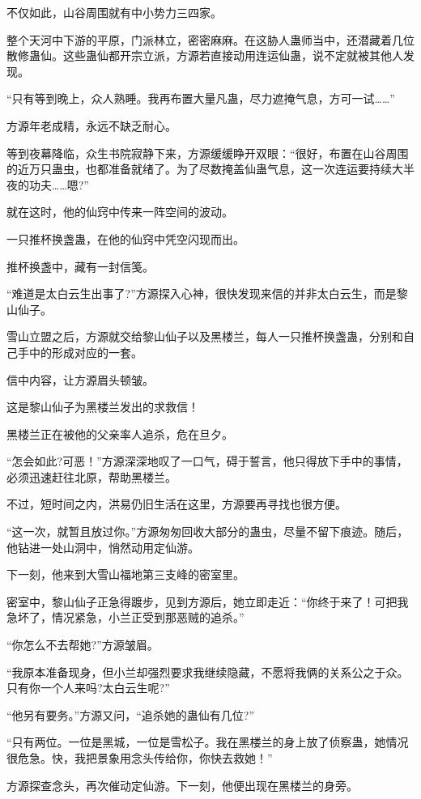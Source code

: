 \begin{this_body}
不仅如此，山谷周围就有中小势力三四家。

整个天河中下游的平原，门派林立，密密麻麻。在这胁人蛊师当中，还潜藏着几位散修蛊仙。这些蛊仙都开宗立派，方源若直接动用连运仙蛊，说不定就被其他人发现。

“只有等到晚上，众人熟睡。我再布置大量凡蛊，尽力遮掩气息，方可一试……”

方源年老成精，永远不缺乏耐心。

等到夜幕降临，众生书院寂静下来，方源缓缓睁开双眼：“很好，布置在山谷周围的近万只蛊虫，也都准备就绪了。为了尽数掩盖仙蛊气息，这一次连运要持续大半夜的功夫……嗯?”

就在这时，他的仙窍中传来一阵空间的波动。

一只推杯换盏蛊，在他的仙窍中凭空闪现而出。

推杯换盏中，藏有一封信笺。

“难道是太白云生出事了?”方源探入心神，很快发现来信的并非太白云生，而是黎山仙子。

雪山立盟之后，方源就交给黎山仙子以及黑楼兰，每人一只推杯换盏蛊，分别和自己手中的形成对应的一套。

信中内容，让方源眉头顿皱。

这是黎山仙子为黑楼兰发出的求救信！

黑楼兰正在被他的父亲率人追杀，危在旦夕。

“怎会如此?可恶！”方源深深地叹了一口气，碍于誓言，他只得放下手中的事情，必须迅速赶往北原，帮助黑楼兰。

不过，短时间之内，洪易仍旧生活在这里，方源要再寻找也很方便。

“这一次，就暂且放过你。”方源匆匆回收大部分的蛊虫，尽量不留下痕迹。随后，他钻进一处山洞中，悄然动用定仙游。

下一刻，他来到大雪山福地第三支峰的密室里。

密室中，黎山仙子正急得踱步，见到方源后，她立即走近：“你终于来了！可把我急坏了，情况紧急，小兰正受到那恶贼的追杀。”

“你怎么不去帮她?”方源皱眉。

“我原本准备现身，但小兰却强烈要求我继续隐藏，不愿将我俩的关系公之于众。只有你一个人来吗?太白云生呢?”

“他另有要务。”方源又问，“追杀她的蛊仙有几位?”

“只有两位。一位是黑城，一位是雪松子。我在黑楼兰的身上放了侦察蛊，她情况很危急。快，我把景象用念头传给你，你快去救她！”

方源探查念头，再次催动定仙游。下一刻，他便出现在黑楼兰的身旁。

\end{this_body}

